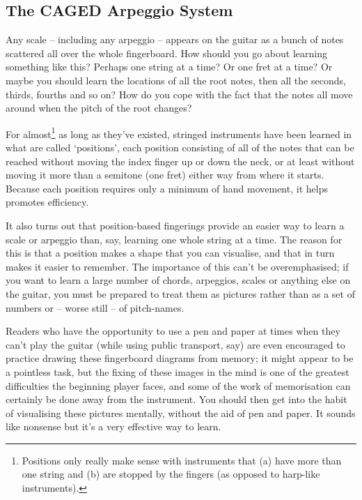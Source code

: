 \documentclass[english]{./gbook}
\begin{document}
\begin{large}
\section{The CAGED Arpeggio System}

Any scale -- including any arpeggio -- appears on the guitar as a bunch of notes scattered all over the whole fingerboard. How should you go about learning something like this? Perhaps one string at a time? Or one fret at a time? Or maybe you should learn the locations of all the root notes, then all the seconds, thirds, fourths and so on? How do you cope with the fact that the notes all move around when the pitch of the root changes?

For almost\footnote{Positions only really make sense with instruments that (a) have more than one string and (b) are stopped by the fingers (as opposed to harp-like instruments).} as long as they've existed, stringed instruments have been learned in what are called `positions', each position consisting of all of the notes that can be reached without moving the index finger up or down the neck, or at least without moving it more than a semitone (one fret) either way from where it starts. Because each position requires only a minimum of hand movement, it helps promotes efficiency.

It also turns out that position-based fingerings provide an easier way to learn a scale or arpeggio than, say, learning one whole string at a time. The reason for this is that a position makes a shape that you can visualise, and that in turn makes it easier to remember. The importance of this can't be overemphasised; if you want to learn a large number of chords, arpeggios, scales or anything else on the guitar, you must be prepared to treat them as pictures rather than as a set of numbers or -- worse still -- of pitch-names. 

Readers who have the opportunity to use a pen and paper at times when they can't play the guitar (while using public transport, say) are even encouraged to practice drawing these fingerboard diagrams from memory; it might appear to be a pointless task, but the fixing of these images in the mind is one of the greatest difficulties the beginning player faces, and some of the work of memorisation can certainly be done away from the instrument. You should then get into the habit of visualising these pictures mentally, without the aid of pen and paper. It sounds like nonsense but it's a very effective way to learn.


\end{large}
\end{document}
